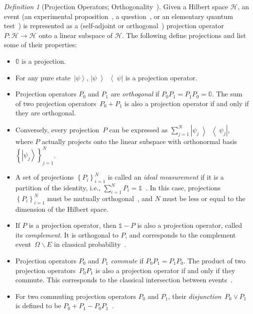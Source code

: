 \documentclass[12pt]{iopart}
\theoremstyle{remark}
\newtheorem{definition}{Definition}
\newcommand{\Hilb}{\mathcal{H}}
\newcommand{\ket}[1]{{\left\vert{#1}\right\rangle}}
\newcommand{\op}[2]{\ensuremath{\left\vert{#1}\middle\rangle\middle\langle{#2}\right\vert}}
\newcommand{\proj}[1]{\op{#1}{#1}}
\begin{document}
\begin{definition}[Projection Operators; Orthogonality~\cite{10.2307/2308516,Redhead1987-REDINA,peres1995quantum,Griffiths2003,Swart2013}]
  \label{def:Projection} Given a Hilbert space $\Hilb$, an event (an
  experimental proposition~\cite{BirkhoffVonNeumann1936}, a
  question~\cite{10.2307/2308516,Abramsky2012},
  or an elementary quantum test~\cite{peres1995quantum}) is represented
  as a (self-adjoint or orthogonal~\cite {Griffiths2003,Maassen2010})
  projection operator $P:\Hilb\rightarrow\Hilb$ onto a linear subspace
  of $\Hilb$. The following define projections and list some of their properties:
\begin{itemize}
\item $\mathbb{0}$ is a projection. 
\item For any pure state~$\ket{\psi}$, $\proj{\psi}$ is a projection
operator. 
\item Projection operators $P_{0}$ and $P_{1}$ are \emph{orthogonal}
  if $P_{0}P_{1}=P_{1}P_{0}=\mathbb{0}$. The sum of two projection
  operators~$P_{0}+P_{1}$ is also a projection operator if and only if
  they are orthogonal.
\item Conversely, every projection~$P$ can be expressed as
  $\sum_{j=1}^{N}\proj{\psi_{j}}$, where $P$ actually projects onto
  the linear subspace with orthonormal
  basis~$\left\{ \ket{\psi_{j}}\right\} _{j=1}^{N}$.
\item A set of projections $\left\{ P_{i}\right\} _{i=1}^{N}$ is
  called an \emph{ideal measurement} if it is a partition of the
  identity, i.e., $\sum_{i=1}^{N}P_{i}=\mathbb{1}$~\cite{Swart2013}.
  In this case, projections $\left\{ P_{i}\right\} _{i=1}^{N}$ must
  be mutually orthogonal~\cite{Griffiths2003,Halmos1957}, and $N$ must be less
  or equal to the dimension of the Hilbert space.
\item If $P$ is a projection operator, then $\mathbb{1}-P$ is also a
  projection operator, called its \emph{complement}. It is orthogonal to
  $P$, and corresponds to the complement event~$\Omega\backslash E$ in
  classical probability~\cite{Griffiths2003}.
\item Projection operators $P_{0}$ and $P_{1}$ \emph{commute} if $P_{0}P_{1}=P_{1}P_{0}$.
The product of two projection operators~$P_{0}P_{1}$ is also a projection
operator if and only if they commute. This corresponds to the classical
intersection between events~\cite{peres1995quantum,Griffiths2003}. 
\item For two commuting projection operators $P_{0}$ and $P_{1}$,
  their \emph{disjunction}~$P_{0}\vee P_{1}$ is defined to be
  $P_{0}+P_{1}-P_{0}P_{1}$~\cite{Griffiths2003}.
\end{itemize}
\end{definition}
\end{document}
